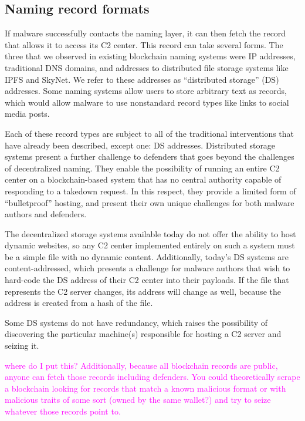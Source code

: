\documentclass[10pt,sigconf,letterpaper]{acmart}
\newcommand{\randall}{\ding{110}\ding{43}\textcolor{magenta}}
\newcommand{\randall}{}
\begin{document}
\subsection{Naming record formats}

If malware successfully contacts the naming layer, it can then fetch the record that allows it to 
access its C2 center. 
This record can take several forms. The three that we observed in existing blockchain naming 
systems were IP addresses, 
traditional DNS domains, and addresses to distributed file storage 
systems like IPFS and SkyNet. We refer to these addresses as ``distributed storage'' (DS) 
addresses. Some naming systems allow users to store arbitrary text as records, which would allow 
malware to use nonstandard record types like links to social media posts. 

Each of these record types are subject to all of the traditional interventions that have already 
been described, except one: DS addresses. Distributed storage systems present a further challenge 
to defenders that goes beyond the challenges of decentralized naming. They enable the 
possibility of running an entire C2 center on a blockchain-based system that has no central 
authority capable of responding to a takedown request. In this respect, they provide a limited form 
of ``bulletproof'' hosting, and present their own unique challenges for 
both malware authors and defenders.

The decentralized storage systems available today do not offer the ability to host dynamic 
websites, so any C2 center implemented entirely on such a system must be a simple file with no 
dynamic content. Additionally, today's DS systems are content-addressed, which presents a challenge 
for malware authors that wish to hard-code the DS address of their C2 center into their payloads. 
If the file that represents the C2 server changes, its address will change as well, because the 
address is created from a hash of the file.

Some DS systems do not have redundancy, which raises the possibility of discovering the particular 
machine(s) responsible for hosting a C2 server and seizing it. 


\randall{where do I put this? Additionally, because all blockchain records 
are public, anyone can fetch those records including 
defenders. You could theoretically scrape a blockchain looking for records that match a known 
malicious format or with malicious traits of some sort (owned by the same wallet?) and try to seize 
whatever those records point to.} 
\end{document}
